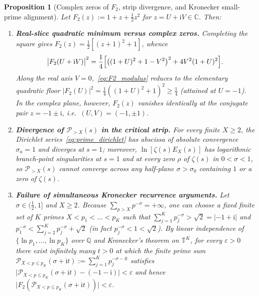 \documentclass[11pt,reqno]{amsart}
\theoremstyle{plain}
\newtheorem{proposition}[theorem]{Proposition}
\theoremstyle{definition}
\theoremstyle{remark}
\numberwithin{equation}{section}
\newcommand{\ii}{\mathrm{i}}
\begin{document}
\begin{proposition}[Complex zeros of $F_2$, strip divergence, and Kronecker small-prime alignment]\label{prop:kronecker_obstruction}
Let $F_2(z) := 1 + z + \frac{1}{2}z^2$ for $z = U + \ii V \in \mathbb{C}$. Then:
\begin{enumerate}[label=\textup{(\roman*)},leftmargin=2.2em]
\item \textbf{Real-slice quadratic minimum versus complex zeros.} Completing the square gives $F_2(z) = \frac{1}{2}[(z + 1)^2 + 1]$, whence
\begin{equation}\label{eq:F2_modulus}
\bigl\lvert F_2(U + \ii V)\bigr\rvert^2 = \frac{1}{4}\Bigl[\bigl((1 + U)^2 + 1 - V^2\bigr)^2 + 4V^2(1 + U)^2\Bigr].
\end{equation}
Along the real axis $V = 0$,~\eqref{eq:F2_modulus} reduces to the elementary quadratic floor $\lvert F_2(U)\rvert^2 = \frac{1}{4}((1+U)^2 + 1)^2 \ge \frac{1}{4}$ (attained at $U = -1$). In the complex plane, however, $F_2(z)$ vanishes identically at the conjugate pair $z = -1 \pm \ii$, i.e.\ $(U, V) = (-1, \pm 1)$.
\item \textbf{Divergence of $\mathcal{P}_{>X}(s)$ in the critical strip.} For every finite $X \ge 2$, the Dirichlet series~\eqref{eq:prime_dirichlet} has abscissa of absolute convergence $\sigma_a = 1$ and diverges at $s = 1$; moreover, $\ln[\zeta(s)E_X(s)]$ has logarithmic branch-point singularities at $s = 1$ and at every zero $\rho$ of $\zeta(s)$ in $0 < \sigma < 1$, so $\mathcal{P}_{>X}(s)$ cannot converge across any half-plane $\sigma > \sigma_0$ containing $1$ or a zero of $\zeta(s)$.
\item \textbf{Failure of simultaneous Kronecker recurrence arguments.} Let $\sigma \in (\frac{1}{2}, 1]$ and $X \ge 2$. Because $\sum_{p > X} p^{-\sigma} = +\infty$, one can choose a fixed finite set of $K$ primes $X < p_1 < \dots < p_K$ such that $\sum_{j=1}^K p_j^{-\sigma} > \sqrt{2} = \lvert -1 + \ii\rvert$ and $p_1^{-\sigma} < \sum_{j=2}^K p_j^{-\sigma} + \sqrt{2}$ (in fact $p_j^{-\sigma} < 1 < \sqrt{2}$). By linear independence of $\{\ln p_1, \dots, \ln p_K\}$ over $\mathbb{Q}$ and Kronecker's theorem on $\mathbb{T}^K$, for every $\varepsilon > 0$ there exist infinitely many $t > 0$ at which the finite prime sum $\mathcal{P}_{X < p \le p_K}(\sigma + \ii t) := \sum_{j=1}^K p_j^{-\sigma - \ii t}$ satisfies $\lvert\mathcal{P}_{X < p \le p_K}(\sigma + \ii t) - (-1 - \ii)\rvert < \varepsilon$ and hence $\lvert F_2(\mathcal{P}_{X < p \le p_K}(\sigma + \ii t))\rvert < \varepsilon$.
\end{enumerate}
\end{proposition}
\end{document}
